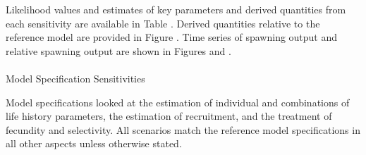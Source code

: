 \documentclass[
]{scrartcl}
\makeatletter
\let\oldparagraph\paragraph
\renewcommand{\paragraph}{
    \@ifstar
      \xxxParagraphStar
      \xxxParagraphNoStar
  }
\newcommand{\xxxParagraphStar}[1]{\oldparagraph*{#1}\mbox{}}
\newcommand{\xxxParagraphNoStar}[1]{\oldparagraph{#1}\mbox{}}
\makeatother
\begin{document}
Likelihood values and estimates of key parameters and derived quantities
from each sensitivity are available in Table . Derived quantities
relative to the reference model are provided in Figure . Time series of
spawning output and relative spawning output are shown in Figures and .

\paragraph{Model Specification Sensitivities}\label{senstivities}

Model specifications looked at the estimation of individual and
combinations of life history parameters, the estimation of recruitment,
and the treatment of fecundity and selectivity. All scenarios match the
reference model specifications in all other aspects unless otherwise
stated.
\end{document}

